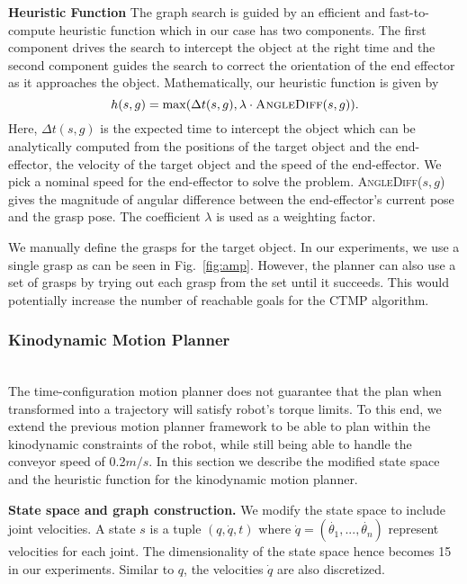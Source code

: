 \documentclass[a4paper]{report}
\begin{document}
\textbf{Heuristic Function}
The graph search is guided by an efficient and fast-to-compute heuristic function which in our case has two components.
The first component drives the search to intercept the object at the right time and 
the second component guides the search to correct the orientation of the end effector as it approaches the object. 
Mathematically, our heuristic function is given by
\begin{equation} \label{eq:h1}
 h(s,g) = \max (\Delta t(s,g), \lambda \cdot \textsc{AngleDiff}(s,g)).
\end{equation}
Here, $\Delta t(s,g)$ is the expected time to intercept the object which can be analytically computed from the positions of the target object and the end-effector, the velocity of the target object and the speed of the end-effector. We pick a nominal speed for the end-effector to solve the problem. \textsc{AngleDiff}($s,g$) gives the magnitude of angular difference between the end-effector's current pose and the grasp pose. The coefficient $\lambda$ is used as a weighting factor.

We manually define the grasps for the target object. In our experiments, we use a single grasp as can be seen in Fig.~\ref{fig:amp}. However, the planner can also use a set of grasps by trying out each grasp from the set until it succeeds. This would potentially increase the number of reachable goals for the CTMP algorithm.
\subsubsection{Kinodynamic Motion Planner}
\hfill\\
The time-configuration motion planner does not guarantee that the plan when transformed into a trajectory will satisfy robot's torque limits. To this end, we extend the previous motion planner framework to be able to plan within the kinodynamic constraints of the robot, while still being able to handle the conveyor speed of 0.2$m/s$. In this section we describe the modified state space and the heuristic function for the kinodynamic motion planner.

\textbf{State space and graph construction.}
We modify the state space to include joint velocities. A state $s$ is a tuple $(q,\dot{q},t)$ where $\dot{q} = (\dot{\theta_1},..., \dot{\theta_n})$ represent velocities for each joint. The dimensionality of the state space hence becomes 15 in our experiments. Similar to $q$, the velocities $\dot{q}$ are also discretized.
\end{document}
